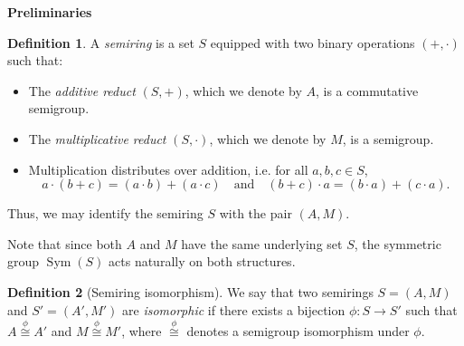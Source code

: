 \documentclass{article}
\theoremstyle{definition}
\newtheorem{definition}{Definition}
\begin{document}
\begin{center}
    \textbf{Preliminaries}
\end{center}
\begin{definition}
    \label{def:semiring}
    A \emph{semiring} is a set \(S\) equipped with two binary operations \((+, \cdot)\) such that:
    \begin{itemize}
        \item The \emph{additive reduct} \((S, +)\), which we denote by \(A\), is a commutative semigroup.
        \item The \emph{multiplicative reduct} \((S, \cdot)\), which we denote by \(M\), is a semigroup.
        \item Multiplication distributes over addition, i.e. for all \(a, b, c \in S\),
        \[
        a \cdot (b + c) = (a \cdot b) + (a \cdot c) \quad \text{and} \quad (b + c) \cdot a = (b \cdot a) + (c \cdot a).
        \]
    \end{itemize}
    Thus, we may identify the semiring \(S\) with the pair \((A, M)\).
\end{definition}
    Note that since both \(A\) and \(M\) have the same underlying set \(S\), the symmetric group \(\operatorname{Sym}(S)\) acts naturally on both structures.
\begin{definition}[Semiring isomorphism]
    We say that two semirings \(S = (A, M)\) and \(S' = (A', M')\) are \emph{isomorphic} if there exists a bijection \(\phi: S \to S'\) such that \(A \overset{\phi}\cong A'\) and \(M \overset{\phi}\cong M'\), where \(\overset{\phi}\cong\) denotes a semigroup isomorphism under \(\phi\).
\end{definition}
\end{document}

